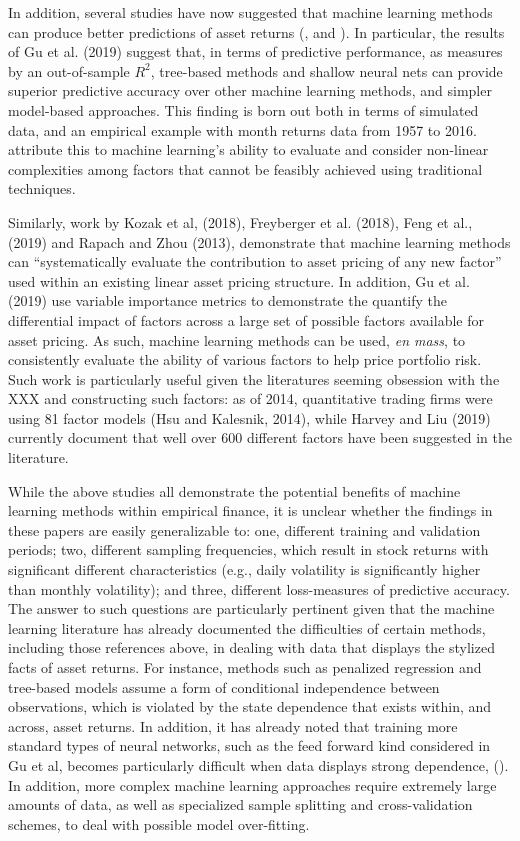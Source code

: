 \documentclass{article}
\begin{document}
In addition, several studies have now suggested that machine learning methods can produce better predictions of asset returns (\cite{gu_empirical_2018}, \cite{hsu_finding_2014} and \cite{feng_deep_2018}). In particular, the results of Gu et al. (2019) suggest that, in terms of predictive performance, as measures by an out-of-sample $R^2$,  tree-based methods and shallow neural nets can provide superior predictive accuracy over other machine learning methods, and simpler model-based approaches. This finding is born out both in terms of simulated data, and an empirical example with month returns data from 1957 to 2016. \cite{gu_empirical_2018} attribute this to machine learning's ability to evaluate and consider non-linear complexities among factors that cannot be feasibly achieved using traditional techniques. 


Similarly, work by Kozak et al, (2018), Freyberger et al. (2018), Feng et al., (2019) and Rapach and Zhou (2013), demonstrate that machine learning methods can ``systematically evaluate the contribution to asset
pricing of any new factor'' used within an existing linear asset pricing structure. In addition, Gu et al. (2019) use variable importance metrics to demonstrate the quantify the differential impact of factors across a large set of possible factors available for asset pricing. As such, machine learning methods can be used, \textit{en mass}, to consistently evaluate the ability of various factors to help price portfolio risk. Such work is particularly useful given the literatures seeming obsession with the XXX and constructing such factors: as of 2014, quantitative trading firms were using 81 factor models (Hsu and Kalesnik, 2014), while Harvey and Liu (2019) currently document that well over 600 different factors have been suggested in the literature. 


While the above studies all demonstrate the potential benefits of machine learning methods within empirical finance, it is unclear whether the findings in these papers are easily generalizable to: one, different training and validation periods; two, different sampling frequencies, which result in stock returns with significant different characteristics (e.g., daily volatility is significantly higher than monthly volatility); and three, different loss-measures of predictive accuracy. The answer to such questions are particularly pertinent given that the machine learning literature has already documented the difficulties of certain methods, including those references above, in dealing with data that displays the stylized facts of asset returns. For instance, methods such as penalized regression and tree-based models assume a form of conditional independence between observations, which is violated by the state dependence that exists within, and across, asset returns. In addition, it has already noted that training more standard types of neural networks, such as the feed forward kind considered in Gu et al,  becomes particularly difficult when data displays strong dependence, (\cite{bengio_learning_1994}). In addition, more complex machine learning approaches require extremely large amounts of data, as well as specialized sample splitting and cross-validation schemes, to deal with possible model over-fitting. 
\end{document}
